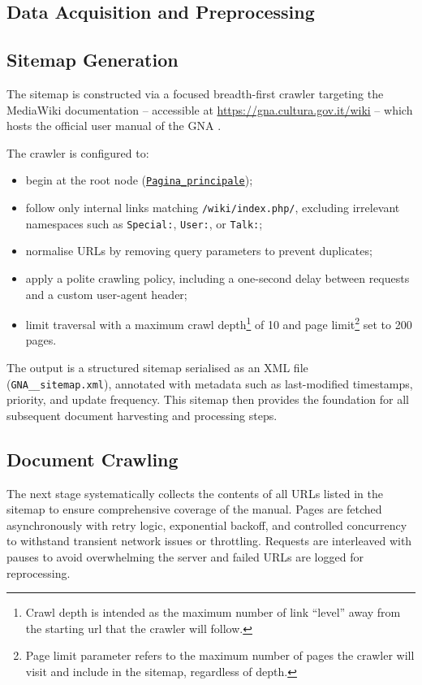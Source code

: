\begin{spacing}{1.5}
\sloppy
\section{Data Acquisition and Preprocessing}
\subsection{Sitemap Generation}
The sitemap is constructed via a focused breadth-first crawler targeting the MediaWiki documentation -- accessible at \url{https://gna.cultura.gov.it/wiki} -- which hosts the official user manual of the GNA \citep{mic_mic_2019}. 

The crawler is configured to:
\begin{itemize}
      \item begin at the root node (\texttt{\href{https://web.archive.org/web/20250803092155/https://gna.cultura.gov.it/wiki/index.php/Pagina_principale}{Pagina\_principale}}\nocite{noauthor_wiki_2025});
      \item follow only internal links matching \texttt{/wiki/index.php/}, excluding irrelevant namespaces such as \texttt{Special:}, \texttt{User:}, or \texttt{Talk:};
      \item normalise URLs by removing query parameters to prevent duplicates;
      \item apply a polite crawling policy, including a one-second delay between requests and a custom user-agent header;
      \item limit traversal with a maximum crawl depth\footnote{Crawl depth is intended as the maximum number of link ``level'' away from the starting url that the crawler will follow.} of 10 and page limit\footnote{Page limit parameter refers to the maximum number of pages the crawler will visit and include in the sitemap, regardless of depth.} set to 200 pages.
\end{itemize}

The output is a structured sitemap serialised as an XML file (\texttt{GNA\_\_sitemap.xml}), annotated with metadata such as last-modified timestamps, priority, and update frequency. This sitemap then provides the foundation for all subsequent document harvesting and processing steps.

\subsection{Document Crawling}
The next stage systematically collects the contents of all URLs listed in the sitemap to ensure comprehensive coverage of the manual. Pages are fetched asynchronously with retry logic, exponential backoff, and controlled concurrency to withstand transient network issues or throttling. Requests are interleaved with pauses to avoid overwhelming the server and failed URLs are logged for reprocessing.


\end{spacing}
